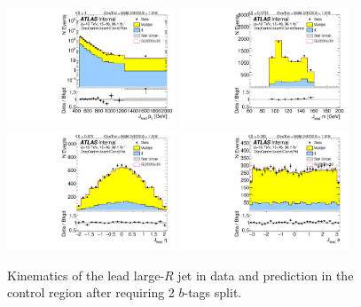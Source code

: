 \clearpage

\begin{figure}[htbp!]
\begin{center}
\includegraphics[angle=270, width=0.45\textwidth]{./figures/boosted/Control/b77_TwoTag_split_Control_leadHCand_Pt_m_1.pdf}
\includegraphics[angle=270, width=0.45\textwidth]{./figures/boosted/Control/b77_TwoTag_split_Control_leadHCand_Mass_s.pdf}\\
\includegraphics[angle=270, width=0.45\textwidth]{./figures/boosted/Control/b77_TwoTag_split_Control_leadHCand_Eta.pdf}
\includegraphics[angle=270, width=0.45\textwidth]{./figures/boosted/Control/b77_TwoTag_split_Control_leadHCand_Phi.pdf}
  \caption{Kinematics of the lead large-$R$ jet in data and prediction in the control region after requiring 2 $b$-tags split. }
  \label{fig:boosted-2bs-control-ak10-lead}
\end{center}
\end{figure}

